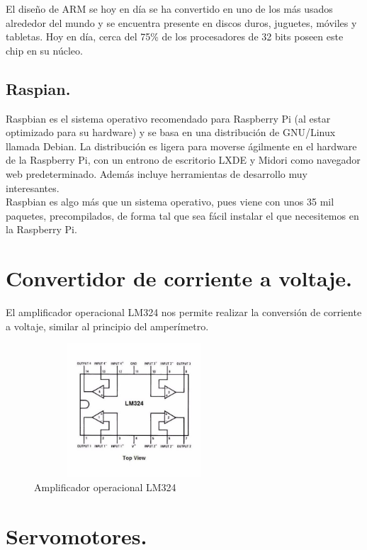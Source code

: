 El diseño de ARM se hoy en día se ha convertido en uno de los más usados alrededor del mundo y se encuentra presente en discos duros, juguetes, móviles y tabletas. Hoy en día, cerca del 75\% de los procesadores de 32 bits poseen este chip en su núcleo. ~\cite{ARM}

\subsection{Raspian.}

Raspbian es el sistema operativo recomendado para Raspberry Pi (al estar optimizado para su hardware) y se basa en una distribución de GNU/Linux llamada Debian. La distribución es ligera para moverse ágilmente  en el hardware de la Raspberry Pi, con un entrono de escritorio LXDE y Midori como navegador web predeterminado. Además incluye herramientas de desarrollo muy interesantes. \\

 Raspbian es algo más que un sistema operativo, pues viene con unos 35 mil paquetes, precompilados, de forma tal que sea fácil instalar el que necesitemos en la Raspberry Pi.


\section{Convertidor de corriente a voltaje.}
El amplificador operacional LM324 nos permite realizar la conversión de corriente a voltaje, similar al principio del amperímetro.

\begin{figure}[H]
\centering
\includegraphics[width=7.5cm, height=5cm]{./images/estado-arte/LM324.jpg}
\caption{Amplificador operacional LM324}
\label{fig:lm324}
\end{figure}

\section{Servomotores.}

